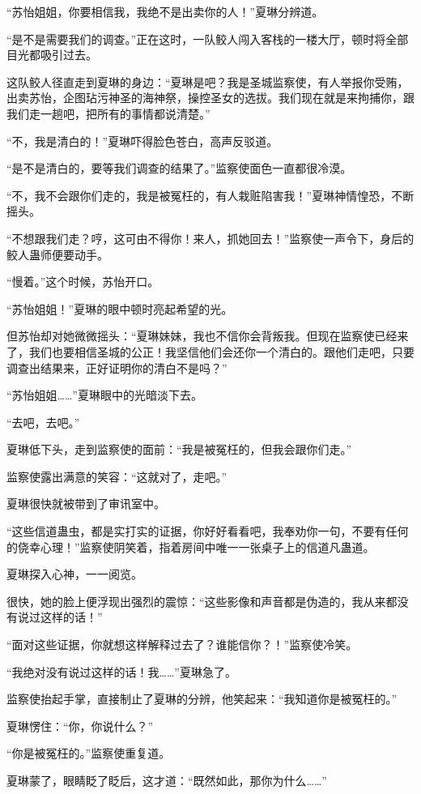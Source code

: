 \begin{this_body}
“苏怡姐姐，你要相信我，我绝不是出卖你的人！”夏琳分辨道。

“是不是需要我们的调查。”正在这时，一队鲛人闯入客栈的一楼大厅，顿时将全部目光都吸引过去。

这队鲛人径直走到夏琳的身边：“夏琳是吧？我是圣城监察使，有人举报你受贿，出卖苏怡，企图玷污神圣的海神祭，操控圣女的选拔。我们现在就是来拘捕你，跟我们走一趟吧，把所有的事情都说清楚。”

“不，我是清白的！”夏琳吓得脸色苍白，高声反驳道。

“是不是清白的，要等我们调查的结果了。”监察使面色一直都很冷漠。

“不，我不会跟你们走的，我是被冤枉的，有人栽赃陷害我！”夏琳神情惶恐，不断摇头。

“不想跟我们走？哼，这可由不得你！来人，抓她回去！”监察使一声令下，身后的鲛人蛊师便要动手。

“慢着。”这个时候，苏怡开口。

“苏怡姐姐！”夏琳的眼中顿时亮起希望的光。

但苏怡却对她微微摇头：“夏琳妹妹，我也不信你会背叛我。但现在监察使已经来了，我们也要相信圣城的公正！我坚信他们会还你一个清白的。跟他们走吧，只要调查出结果来，正好证明你的清白不是吗？”

“苏怡姐姐……”夏琳眼中的光暗淡下去。

“去吧，去吧。”

夏琳低下头，走到监察使的面前：“我是被冤枉的，但我会跟你们走。”

监察使露出满意的笑容：“这就对了，走吧。”

夏琳很快就被带到了审讯室中。

“这些信道蛊虫，都是实打实的证据，你好好看看吧，我奉劝你一句，不要有任何的侥幸心理！”监察使阴笑着，指着房间中唯一一张桌子上的信道凡蛊道。

夏琳探入心神，一一阅览。

很快，她的脸上便浮现出强烈的震惊：“这些影像和声音都是伪造的，我从来都没有说过这样的话！”

“面对这些证据，你就想这样解释过去了？谁能信你？！”监察使冷笑。

“我绝对没有说过这样的话！我……”夏琳急了。

监察使抬起手掌，直接制止了夏琳的分辨，他笑起来：“我知道你是被冤枉的。”

夏琳愣住：“你，你说什么？”

“你是被冤枉的。”监察使重复道。

夏琳蒙了，眼睛眨了眨后，这才道：“既然如此，那你为什么……”


\end{this_body}
